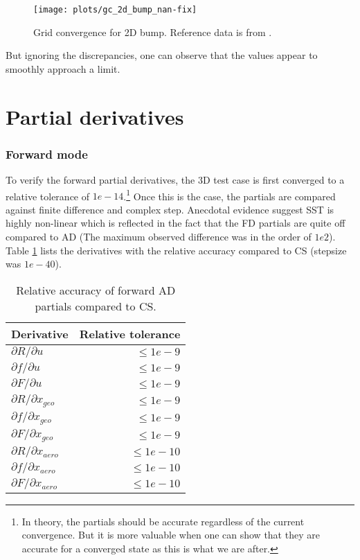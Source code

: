 \begin{figure}[H] \centering
    \texttt{[image: plots/gc\_2d\_bump\_nan-fix]}
    \caption{Grid convergence for 2D bump. Reference data is from
    \cite{nasatmr}.}
    \label{fig:gc_2d_bump}
\end{figure}

\noindent But ignoring the discrepancies, one can observe that the values
appear to smoothly approach a limit.







\section{Partial derivatives}
\subsubsection{Forward mode}
To verify the forward partial derivatives, the 3D test case is first converged
to a relative tolerance of $1e-14$.\footnote{In theory, the partials should be
accurate regardless of the current convergence. But it is more valuable when
one can show that they are accurate for a converged state as this is what we
are after. } Once this is the case, the partials are compared against finite
difference and complex step. Anecdotal evidence suggest SST is highly
non-linear which is reflected in the fact that the FD partials are quite off
compared to AD (The maximum observed difference was in the order of $1e2$).
Table \ref{tab:partials_forward} lists the derivatives with the relative
accuracy compared to CS (stepsize was $1e-40$). 
\begin{table}[H]
    \centering
    \begin{tabular}{l r}
        \toprule
        Derivative                          & Relative tolerance \\
        \toprule
        $\partial R / \partial u$           & $\leq 1e-9$ \\
        $\partial f / \partial u$           & $\leq 1e-9$ \\
        $\partial F / \partial u$           & $\leq 1e-9$ \\
        \midrule
        $\partial R / \partial x_{geo}$     & $\leq 1e-9$ \\
        $\partial f / \partial x_{geo}$     & $\leq 1e-9$ \\
        $\partial F / \partial x_{geo}$     & $\leq 1e-9$ \\
        \midrule
        $\partial R / \partial x_{aero}$    & $\leq 1e-10$ \\
        $\partial f / \partial x_{aero}$    & $\leq 1e-10$ \\
        $\partial F / \partial x_{aero}$    & $\leq 1e-10$ \\
        \bottomrule
    \end{tabular}
    \caption{Relative accuracy of forward AD partials compared to CS.}
    \label{tab:partials_forward}
\end{table}

